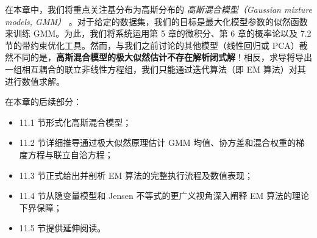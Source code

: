 在本章中，我们将重点关注基分布为高斯分布的 \emph{高斯混合模型（Gaussian mixture models, GMM）} 。对于给定的数据集，我们的目标是最大化模型参数的似然函数来训练 GMM。为此，我们将系统运用第 5 章的微积分、第 6 章的概率论以及 7.2 节的带约束优化工具。然而，与我们之前讨论的其他模型（线性回归或 PCA）截然不同的是，\textbf{高斯混合模型的极大似然估计不存在解析闭式解}！相反，求导将导出一组相互耦合的联立非线性方程组，我们只能通过迭代算法（即 EM 算法）对其进行数值求解。

在本章的后续部分：

\begin{itemize}
\item 11.1 节形式化高斯混合模型；
\item 11.2 节详细推导通过极大似然原理估计 GMM 均值、协方差和混合权重的梯度方程与联立自洽方程；
\item 11.3 节正式给出并剖析 EM 算法的完整执行流程及数值表现；
\item 11.4 节从隐变量模型和 Jensen 不等式的更广义视角深入阐释 EM 算法的理论下界保障；
\item 11.5 节提供延伸阅读。
\end{itemize}

